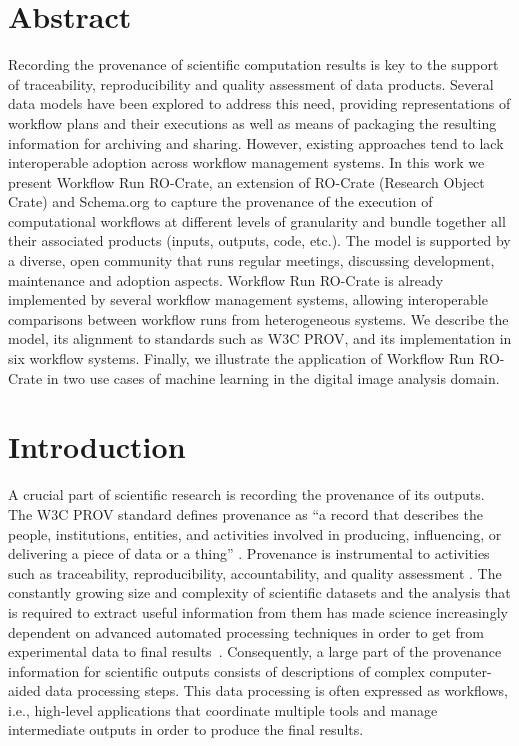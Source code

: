 \documentclass[10pt,letterpaper]{article}
\begin{document}
\section*{Abstract}
Recording the provenance of scientific computation results is key to the support of traceability, reproducibility and quality assessment of data products.
Several data models have been explored to address this need, providing representations of workflow plans and their executions as well as means of packaging the resulting information for archiving and sharing.
However, existing approaches tend to lack interoperable adoption across workflow management systems.
In this work we present Workflow Run RO-Crate, an extension of RO-Crate (Research Object Crate) and Schema.org to capture the provenance of the execution of computational workflows at different levels of granularity and bundle together all their associated products (inputs, outputs, code, etc.).
The model is supported by a diverse, open community that runs regular meetings, discussing development, maintenance and adoption aspects.
Workflow Run RO-Crate is already implemented by several workflow management systems, allowing interoperable comparisons between workflow runs from heterogeneous systems.
We describe the model, its alignment to standards such as W3C PROV, and its implementation in six workflow systems.
Finally, we illustrate the application of Workflow Run RO-Crate in two use cases of machine learning in the digital image analysis domain.


\linenumbers




\section{Introduction}\label{introduction}

A crucial part of scientific research is recording the provenance of its outputs.
The W3C PROV standard defines provenance as ``a record that describes the people, institutions, entities, and activities involved in producing, influencing, or delivering a piece of data or a thing''
\cite{Moreau 2013}.
Provenance is instrumental to activities such as traceability, reproducibility, accountability, and quality assessment
\cite{Herschel 2017}.
The constantly growing size and complexity of scientific datasets and the analysis that is required to extract useful information from them has made science increasingly dependent on advanced automated processing techniques in order to get from experimental data to final results~\cite{Himanen 2019, Gauthier 2019, Huntingford 2019}.
Consequently, a large part of the provenance information for scientific outputs consists of descriptions of complex computer-aided data processing steps. This data processing is often expressed as workflows, i.e., high-level applications that coordinate multiple tools and manage intermediate outputs in order to produce the final results.
\end{document}

